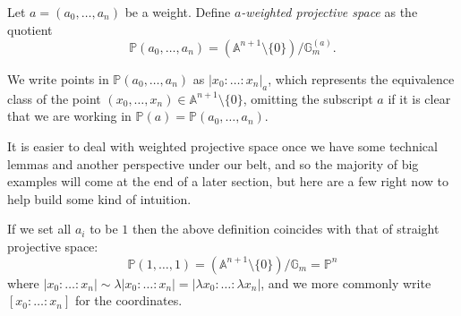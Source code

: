 \documentclass[10pt,notitlepage]{article}
\numberwithin{equation}{subsection}
\newcommand{\aff}{\mathbb{A}}
\newcommand{\pee}{\mathbb{P}}
\newcommand{\gm}{\mathbb{G}_m}
\newcommand{\noz}{\setminus\{0\}}
\begin{document}
    \begin{definition}
    \label{def:geometric_wps}
        Let $a=(a_0,\ldots,a_n)$ be a weight.
        Define \emph{$a$-weighted projective space} as the quotient
        \[
            \pee(a_0,\ldots,a_n) = (\aff^{n+1}\noz)/\gm^{(a)}.
        \]
        
        We write points in $\pee(a_0,\ldots,a_n)$ as $|x_0:\ldots:x_n|_a$, which represents the equivalence class of the point $(x_0,\ldots,x_n)\in\aff^{n+1}\noz$, omitting the subscript $a$ if it is clear that we are working in $\pee(a)=\pee(a_0,\ldots,a_n)$.
    \end{definition}

    It is easier to deal with weighted projective space once we have some technical lemmas and another perspective under our belt, and so the majority of big examples will come at the end of a later section, but here are a few right now to help build some kind of intuition.

    \begin{example}
        If we set all $a_i$ to be $1$ then the above definition coincides with that of straight projective space:
        \[
            \pee(1,\ldots,1) = (\aff^{n+1}\noz)/\gm = \pee^n
        \]
        where $|x_0:\ldots:x_n|\sim\lambda|x_0:\ldots:x_n|=|\lambda x_0:\ldots:\lambda x_n|$, and we more commonly write $[x_0:\ldots:x_n]$ for the coordinates.
    \end{example}
\end{document}

